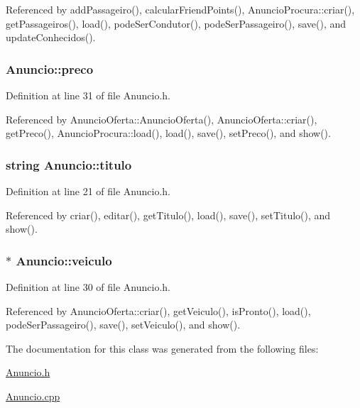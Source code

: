 Referenced by add\+Passageiro(), calcular\+Friend\+Points(), Anuncio\+Procura\+::criar(), get\+Passageiros(), load(), pode\+Ser\+Condutor(), pode\+Ser\+Passageiro(), save(), and update\+Conhecidos().

\hypertarget{class_anuncio_aa780fd8e07586a3af117fd20593fb1b4}{
\subsubsection[{preco}]{ Anuncio\+::preco\hspace{0.3cm}{\ttfamily [protected]}}}\label{class_anuncio_aa780fd8e07586a3af117fd20593fb1b4}


Definition at line 31 of file Anuncio.\+h.



Referenced by Anuncio\+Oferta\+::\+Anuncio\+Oferta(), Anuncio\+Oferta\+::criar(), get\+Preco(), Anuncio\+Procura\+::load(), load(), save(), set\+Preco(), and show().

\hypertarget{class_anuncio_adb34bedd8220f42b9ee37662c21313e6}{
\subsubsection[{titulo}]{\setlength{\rightskip}{0pt plus 5cm}string Anuncio\+::titulo\hspace{0.3cm}{\ttfamily [protected]}}}\label{class_anuncio_adb34bedd8220f42b9ee37662c21313e6}


Definition at line 21 of file Anuncio.\+h.



Referenced by criar(), editar(), get\+Titulo(), load(), save(), set\+Titulo(), and show().

\hypertarget{class_anuncio_a3cffe1ce2024500bddaf07bd0f7ecc81}{
\subsubsection[{veiculo}]{$\ast$ Anuncio\+::veiculo\hspace{0.3cm}{\ttfamily [protected]}}}\label{class_anuncio_a3cffe1ce2024500bddaf07bd0f7ecc81}


Definition at line 30 of file Anuncio.\+h.



Referenced by Anuncio\+Oferta\+::criar(), get\+Veiculo(), is\+Pronto(), load(), pode\+Ser\+Passageiro(), save(), set\+Veiculo(), and show().



The documentation for this class was generated from the following files\+:\begin{DoxyCompactItemize}
\item 
\hyperlink{_anuncio_8h}{Anuncio.\+h}\item 
\hyperlink{_anuncio_8cpp}{Anuncio.\+cpp}\end{DoxyCompactItemize}
